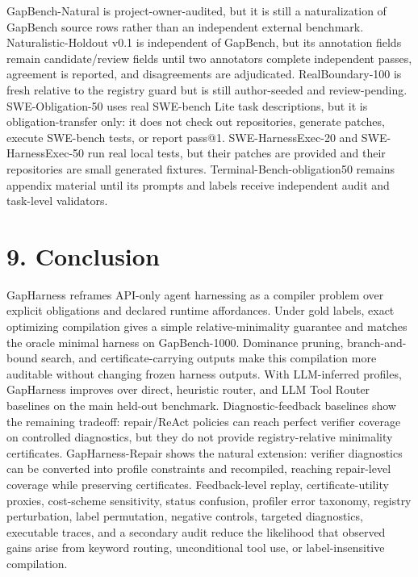 \documentclass[
  10pt,
]{article}
\begin{document}
GapBench-Natural is project-owner-audited, but it is still a
naturalization of GapBench source rows rather than an independent
external benchmark. Naturalistic-Holdout v0.1 is independent of
GapBench, but its annotation fields remain candidate/review fields until
two annotators complete independent passes, agreement is reported, and
disagreements are adjudicated. RealBoundary-100 is fresh relative to the
registry guard but is still author-seeded and review-pending.
SWE-Obligation-50 uses real SWE-bench Lite task descriptions, but it is
obligation-transfer only: it does not check out repositories, generate
patches, execute SWE-bench tests, or report pass@1. SWE-HarnessExec-20
and SWE-HarnessExec-50 run real local tests, but their patches are
provided and their repositories are small generated fixtures.
Terminal-Bench-obligation50 remains appendix material until its prompts
and labels receive independent audit and task-level validators.

\section{9. Conclusion}\label{conclusion}

GapHarness reframes API-only agent harnessing as a compiler problem over
explicit obligations and declared runtime affordances. Under gold
labels, exact optimizing compilation gives a simple relative-minimality
guarantee and matches the oracle minimal harness on GapBench-1000.
Dominance pruning, branch-and-bound search, and certificate-carrying
outputs make this compilation more auditable without changing frozen
harness outputs. With LLM-inferred profiles, GapHarness improves over
direct, heuristic router, and LLM Tool Router baselines on the main
held-out benchmark. Diagnostic-feedback baselines show the remaining
tradeoff: repair/ReAct policies can reach perfect verifier coverage on
controlled diagnostics, but they do not provide registry-relative
minimality certificates. GapHarness-Repair shows the natural extension:
verifier diagnostics can be converted into profile constraints and
recompiled, reaching repair-level coverage while preserving
certificates. Feedback-level replay, certificate-utility proxies,
cost-scheme sensitivity, status confusion, profiler error taxonomy,
registry perturbation, label permutation, negative controls, targeted
diagnostics, executable traces, and a secondary audit reduce the
likelihood that observed gains arise from keyword routing, unconditional
tool use, or label-insensitive compilation.
\end{document}
